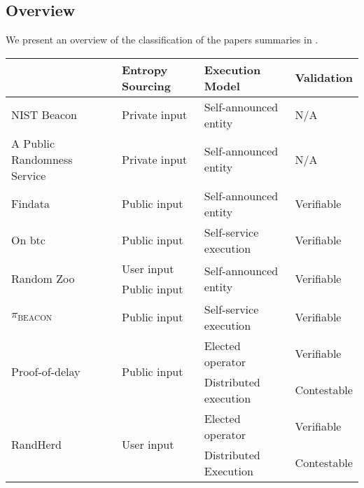 \subsection{Overview}\label{sub:overview}
We present an overview of the classification of the papers summaries in .

\begin{table}[htbp]
    \centering
    \begin{tabularx}{\textwidth}{Xlll}
                               & \textbf{Entropy Sourcing}              & \textbf{Execution Model}               & \textbf{Validation}         \\\midrule
NIST Beacon                    & Private input                 & Self-announced entity                  & N/A                         \\[1.5em]
A Public Randomness Service    & Private input                 & Self-announced entity                  & N/A                         \\[1.5em]
Findata                        & Public  input                  & Self-announced entity                  & Verifiable                  \\[1.5em]
On btc                         & Public input                  & Self-service execution                  & Verifiable                  \\[1.5em]
\multirow{2}{*}{Random Zoo}    & User input                             & \multirow{2}{*}{Self-announced entity} & \multirow{2}{*}{Verifiable} \\
                               & Public input                  &                                        &                             \\[1.5em]
$\pi_\text{BEACON}$            & Public input                  & Self-service execution                 & Verifiable                  \\[1.5em]
\multirow{2}{*}{Proof-of-delay}& \multirow{2}{*}{Public input} & Elected operator                       & Verifiable                  \\
                               &                                        & Distributed execution                  & Contestable                 \\[1.5em]
\multirow{2}{*}{RandHerd}      & \multirow{2}{*}{User input}            & Elected operator                       & Verifiable                  \\
                               &                                        & Distributed Execution                  & Contestable                 \\[1.5em]

\end{tabularx}
\end{table}
